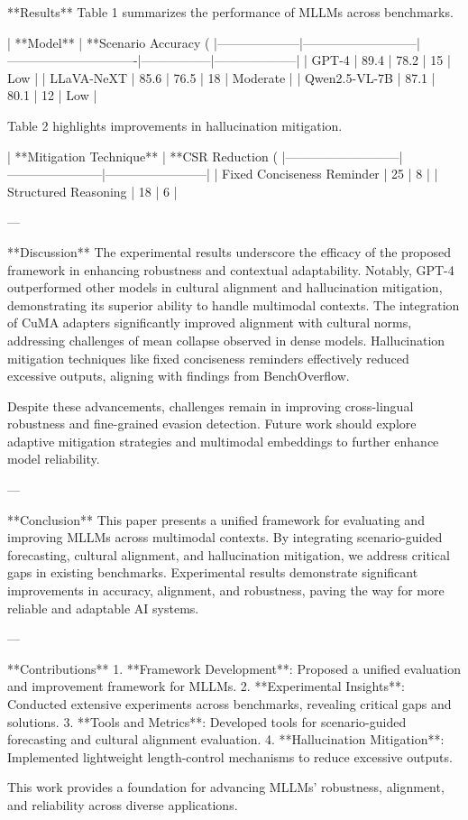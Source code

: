 **Results**  
Table 1 summarizes the performance of MLLMs across benchmarks.

| **Model**         | **Scenario Accuracy (%
|--------------------|---------------------------|-------------------------------|-----------------|--------------------|
| GPT-4             | 89.4                      | 78.2                          | 15              | Low                |
| LLaVA-NeXT        | 85.6                      | 76.5                          | 18              | Moderate           |
| Qwen2.5-VL-7B     | 87.1                      | 80.1                          | 12              | Low                |

Table 2 highlights improvements in hallucination mitigation.

| **Mitigation Technique** | **CSR Reduction (%
|---------------------------|-----------------------|------------------------|
| Fixed Conciseness Reminder | 25                  | 8                     |
| Structured Reasoning       | 18                  | 6                     |

---

**Discussion**  
The experimental results underscore the efficacy of the proposed framework in enhancing robustness and contextual adaptability. Notably, GPT-4 outperformed other models in cultural alignment and hallucination mitigation, demonstrating its superior ability to handle multimodal contexts. The integration of CuMA adapters significantly improved alignment with cultural norms, addressing challenges of mean collapse observed in dense models. Hallucination mitigation techniques like fixed conciseness reminders effectively reduced excessive outputs, aligning with findings from BenchOverflow.

Despite these advancements, challenges remain in improving cross-lingual robustness and fine-grained evasion detection. Future work should explore adaptive mitigation strategies and multimodal embeddings to further enhance model reliability.

---

**Conclusion**  
This paper presents a unified framework for evaluating and improving MLLMs across multimodal contexts. By integrating scenario-guided forecasting, cultural alignment, and hallucination mitigation, we address critical gaps in existing benchmarks. Experimental results demonstrate significant improvements in accuracy, alignment, and robustness, paving the way for more reliable and adaptable AI systems.

---

**Contributions**  
1. **Framework Development**: Proposed a unified evaluation and improvement framework for MLLMs.  
2. **Experimental Insights**: Conducted extensive experiments across benchmarks, revealing critical gaps and solutions.  
3. **Tools and Metrics**: Developed tools for scenario-guided forecasting and cultural alignment evaluation.  
4. **Hallucination Mitigation**: Implemented lightweight length-control mechanisms to reduce excessive outputs.

This work provides a foundation for advancing MLLMs' robustness, alignment, and reliability across diverse applications.